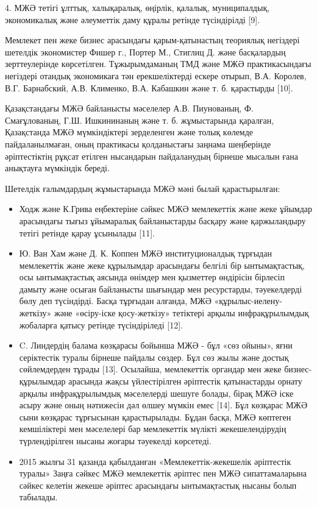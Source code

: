 4. МЖӘ тетігі ұлттық, халықаралық, өңірлік, қалалық, муниципалдық,
экономикалық және әлеуметтік даму құралы ретінде түсіндірілді {[}9{]}.

Мемлекет пен жеке бизнес арасындағы қарым-қатынастың теориялық негіздері
шетелдік экономистер Фишер г., Портер М., Стиглиц Д. және басқалардың
зерттеулерінде көрсетілген. Тұжырымдаманың ТМД және МЖӘ практикасындағы
негіздері отандық экономикаға тән ерекшеліктерді ескере отырып, В.А.
Королев, В.Г. Барнабский, А.В. Клименко, В.А. Кабашкин және т. б.
қарастырды {[}10{]}.

Қазақстандағы МЖӘ байланысты мәселелер А.В. Пиунованың, Ф. Смағұлованың,
Г.Ш. Ишкининаның және т. б. жұмыстарында қаралған, Қазақстанда МЖӘ
мүмкіндіктері зерделенген және толық көлемде пайдаланылмаған, оның
практикасы қолданыстағы заңнама шеңберінде әріптестіктің рұқсат етілген
нысандарын пайдаланудың бірнеше мысалын ғана анықтауға мүмкіндік береді.

Шетелдік ғалымдардың жұмыстарында МЖӘ мәні былай қарастырылған:

\begin{itemize}
\item
  Ходж және К.Грива еңбектеріне сәйкес МЖӘ мемлекеттік және жеке ұйымдар
  арасындағы тығыз ұйымаралық байланыстарды басқару және қаржыландыру
  тетігі ретінде қарау ұсынылады {[}11{]}.
\item
  Ю. Ван Хам және Д. К. Коппен МЖӘ институционалдық тұрғыдан мемлекеттік
  және жеке құрылымдар арасындағы белгілі бір ынтымақтастық, осы
  ынтымақтастық аясында өнімдер мен қызметтер өндірісін бірлесіп дамыту
  және осыған байланысты шығындар мен ресурстарды, тәуекелдерді бөлу деп
  түсіндірді. Басқа тұрғыдан алғанда, МЖӘ «құрылыс-иелену-жеткізу» және
  «өсіру-іске қосу-жеткізу» тетіктері арқылы инфрақұрылымдық жобаларға
  қатысу ретінде түсіндіріледі {[}12{]}.
\item
  C. Линдердің балама көзқарасы бойынша МЖӘ - бұл «сөз ойыны», яғни
  серіктестік туралы бірнеше пайдалы сөздер. Бұл сөз жылы және достық
  сөйлемдерден тұрады {[}13{]}. Осылайша, мемлекеттік органдар мен жеке
  бизнес-құрылымдар арасында жақсы үйлестірілген әріптестік қатынастарды
  орнату арқылы инфрақұрылымдық мәселелерді шешуге болады, бірақ МЖӘ
  іске асыру және оның нәтижесін дәл өлшеу мүмкін емес {[}14{]}. Бұл
  көзқарас МЖӘ сыни көзқарас тұрғысынан қарастырылады. Бұдан басқа, МЖӘ
  көптеген кемшіліктері мен мәселелері бар мемлекеттік мүлікті
  жекешелендірудің түрлендірілген нысаны жоғары тәуекелді көрсетеді.
\item
  2015 жылғы 31 қазанда қабылданған «Мемлекеттік-жекешелік әріптестік
  туралы» Заңға сәйкес МЖӘ мемлекеттік әріптес пен МЖӘ сипаттамаларына
  сәйкес келетін жекеше әріптес арасындағы ынтымақтастық нысаны болып
  табылады.
\end{itemize}

